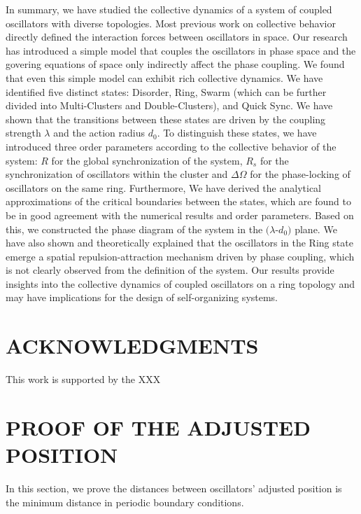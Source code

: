 \documentclass[%
 aip,
 amsmath,amssymb,
 reprint,%
]{revtex4-1}
\begin{document}
In summary, we have studied the collective dynamics of a system of coupled oscillators with diverse topologies. 
Most previous work on collective behavior directly defined the interaction forces between oscillators in space. Our research has introduced a simple model that couples the oscillators in phase space and the govering equations of space only indirectly affect the phase coupling. We found that even this simple model can exhibit rich collective dynamics.
We have identified five distinct states: Disorder, Ring, Swarm (which can be further divided into Multi-Clusters and Double-Clusters), and Quick Sync. 
We have shown that the transitions between these states are driven by the coupling strength $\lambda$ and the action radius $d_0$. 
To distinguish these states, we have introduced three order parameters according to the collective behavior of the system: $R$ for the global synchronization of the system, $R_s$ for the synchronization of oscillators within the cluster and $\Delta\Omega$ for the phase-locking of oscillators on the same ring.
Furthermore, We have derived the analytical approximations of the critical boundaries between the states, which are found to be in good agreement with the numerical results and order parameters. Based on this, we constructed the phase diagram of the system in the $(\lambda$-$d_0)$ plane.
We have also shown and theoretically explained that the oscillators in the Ring state emerge a spatial repulsion-attraction mechanism driven by phase coupling, which is not clearly observed from the definition of the system.
Our results provide insights into the collective dynamics of coupled oscillators on a ring topology and may have implications for the design of self-organizing systems.

\section{ACKNOWLEDGMENTS}

This work is supported by the XXX

\appendix

\section{\label{sec:adj_pos} PROOF OF THE ADJUSTED POSITION}

In this section, we prove the distances between oscillators' adjusted position is the minimum distance in periodic boundary conditions. 
\end{document}
